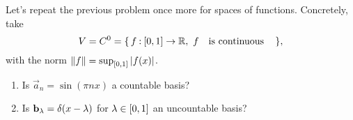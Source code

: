 \documentclass[12pt]{memoir}
\begin{document}
\begin{Ej}
    Let's repeat the previous problem once more for spaces of
functions. Concretely, take
$$V=C^0=\{\,f\mathbin{:}[0,1]\to \mathbb{R},\ f\quad\text{is continuous}\quad\,\},$$
with the norm $\norm{f}=\sup_{\left\lbrack0,1\right\rbrack}|f(x)|$.
\begin{enumerate}
    \item Is $\vec a_n=\sin(\pi n x)$ a countable basis?
    \item Is $\mathbf{b}_\lambda=\delta(x-\lambda)$ for $\lambda\in\left\lbrack0,1\right\rbrack$ an uncountable basis?
\end{enumerate}
\end{Ej}

\begin{ptcbr}
    
\end{ptcbr}
\end{document}
